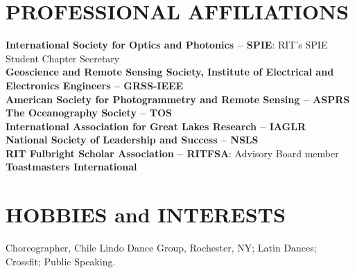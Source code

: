 \documentclass[11pt]{res} %
\begin{document}
\begin{resume}
\vspace{-0.1in}
\section{PROFESSIONAL AFFILIATIONS}
\vspace{0.1in}
{\bf International Society for Optics and Photonics -- SPIE}: RIT's SPIE Student Chapter Secretary 
\vspace{0.1in}\\
{\bf Geoscience and Remote Sensing Society, Institute of Electrical and Electronics Engineers -- GRSS-IEEE}
\vspace{0.1in}\\
{\bf American Society for Photogrammetry and Remote Sensing -- ASPRS}
\vspace{0.1in}\\
{\bf The Oceanography Society -- TOS}
\vspace{0.1in}\\
{\bf International Association for Great Lakes Research -- IAGLR}
\vspace{0.1in}\\
{\bf National Society of Leadership and Success -- NSLS}
\vspace{0.1in}\\
{\bf RIT Fulbright Scholar Association -- RITFSA}: Advisory Board member
\vspace{0.1in}\\
{\bf Toastmasters International}


\vspace{-0.1in}
\section{HOBBIES and INTERESTS}
\vspace{0.1in}
Choreographer, Chile Lindo Dance Group, Rochester, NY; Latin Dances; Crossfit; Public Speaking. \\

\end{resume}
\end{document}
